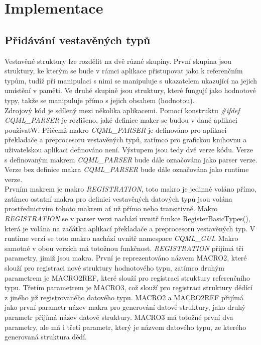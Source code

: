 \documentclass[11pt,twoside,a4paper]{book}
\begin{document}
\chapter{\label{CH:Impl}Implementace}
\section{\label{SEC:header}Přidávání vestavěných typů}
Vestavěné struktury lze rozdělit na dvě různé skupiny. První skupina jsou struktury, ke kterým se bude v rámci aplikace přistupovat jako k referenčním typům, tudíž při manipulaci s nimi se manipuluje s ukazatelem ukazující na jejich umístění v paměti. Ve druhé skupině jsou struktury, které fungují jako hodnotové typy, takže se manipuluje přímo s jejich obsahem (hodnotou).\\
Zdrojový kód je sdílený mezi několika aplikacemi. Pomocí konstruktu \textit{\#ifdef CQML\_PARSER} je rozlišeno, jaké definice maker se budou v dané aplikaci používatW. Přičemž makro \textit{CQML\_PARSER} je definováno pro aplikaci překladače a preprocesoru vestavěných typů, zatímco pro grafickou knihovnu a uživatelskou aplikaci definováno není. Výstupem jsou tedy dvě verze kódu. Verze s definovaným makrem \textit{CQML\_PARSER} bude dále označována jako parser verze. Verze bez definice makra \textit{CQML\_PARSER} bude dále označována jako runtime verze.\\
Prvním makrem je makro \textit{REGISTRATION}, toto makro je jedinné voláno přímo, zatímco ostatní makra pro definici vestavěných datových typů jsou volána prostřednictvím tohoto makrem ať už přímo nebo transitivně. Makro \textit{REGISTRATION} se v parser verzi nachází uvnitř funkce RegisterBasicTypes(), která je volána na začátku aplikací překladače a preprocesoru vestavěných typ. V runtime verzi se toto makro nachází uvnitř namespace \textit{CQML}\_\textit{GUI}. Makro samotné v obou verzích má totožnou funkčnost. \textit{REGISTRATION} přijímá tři parametry, jimiž jsou makra. První je reprezentováno názvem MACRO2, které slouží pro registraci nové struktury hodnotového typu, zatímco druhým parametrem je MACRO2REF, které slouží pro registraci struktury referenčního typu. Třetím parametrem je MACRO3, což slouží pro registraci struktury dědící z jiného již registrovaného datového typu. MACRO2 a MACRO2REF přijímá jako první parametr název makra pro generování datové struktury, jako druhý parametr přijímá název datové struktury. MACRO3 má totožné první dva parametry, ale má i třetí parametr, který je názvem datového typu, ze kterého generovaná struktura dědí. \\
\end{document}
